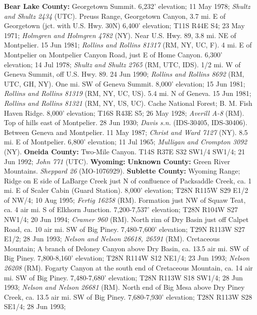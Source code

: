   \textbf{Bear Lake County:}
Georgetown Summit. 6,232' elevation; 11 May 1978;
\textit{Shultz and Shultz 2434} (UTC).
Preuss Range, Georgetown Canyon, 3.7 mi. E of Georgetown
(jct. with U.S. Hwy. 30N) 6,400' elevation; T11S R44E S4; 23 May 1971;
\textit{Holmgren and Holmgren 4782} (NY).
Near U.S. Hwy. 89, 3.8 mi. NE of Montpelier. 15 Jun 1981;
\textit{Rollins and Rollins 81317} (RM, NY, UC, F).
4 mi. E of Montpelier on Montpelier Canyon Road, just E of Home Canyon.
6,300' elevation; 14 Jul 1978; \textit{Shultz and Shultz 2765} (RM, UTC, IDS).
1/2 mi. W of Geneva Summit, off U.S. Hwy. 89. 24 Jun 1990;
\textit{Rollins and Rollins 8692} (RM, UTC, GH, NY).
One mi. SW of Geneva Summit. 8,000' elevation; 15 Jun 1981;
\textit{Rollins and Rollins 81319} (RM, NY, UC, US).
5.4 mi. N of Geneva. 15 Jun 1981;
\textit{Rollins and Rollins 81321} (RM, NY, US, UC).
Cache National Forest; B. M. Fish Haven Ridge. 8,000' elevation; T16S R43E S5;
26 May 1928; \textit{Averill A-8} (RM).
Top of hills east of Montpelier. 28 Jun 1930;
\textit{Davis s.n.} (IDS-30405, IDS-30406).
Between Geneva and Montpelier. 11 May 1987; \textit{Christ and Ward 7127} (NY).
8.5 mi. E of Montpelier. 6,800' elevation; 11 Jul 1965;
\textit{Mulligan and Crompton 3092} (NY).
  \textbf{Oneida County:}
Two-Mile Canyon. T14S R37E S32 SW1/4 SW1/4; 21 Jun 1992;
\textit{John 771} (UTC).
  \textbf{Wyoming:}
  \textbf{Unknown County:}
Green River Mountains. \textit{Sheppard 26} (MO-1076929).
  \textbf{Sublette County:}
Wyoming Range; Ridge on E side of LaBarge Creek just N of confluence of
Packsaddle Creek, ca. 1 mi. E of Scaler Cabin (Guard Station).
8,000’ elevation; T28N R115W S29 E1/2 of NW/4; 10 Aug 1995;
\textit{Fertig 16258} (RM).
Formation just NW of Squaw Teat, ca. 4 air mi. S of Elkhorn Junction.
7,200-7,537' elevation; T28N R104W S27 NW1/4; 20 Jun 1994;
\textit{Cramer 960} (RM).
North rim of Dry Basin just off Calpet Road, ca. 10 air mi. SW of Big Piney.
7,480-7,600’ elevation; T29N R113W S27 E1/2; 28 Jun 1993;
\textit{Nelson and Nelson 26618, 26591} (RM).
Cretaceous Mountain; A branch of Deloney Canyon above Dry Basin, ca. 13.5 air
mi. SW of Big Piney. 7,800-8,160’ elevation; T28N R114W S12 NE1/4; 23 Jun 1993;
\textit{Nelson 26208} (RM).
Fogarty Canyon at the south end of Cretaceous Mountain, ca. 14 air mi. SW of
Big Piney. 7,480-7,680’ elevation; T28N R113W S18 SW1/4; 28 Jun 1993;
\textit{Nelson and Nelson 26681} (RM).
North end of Big Mesa above Dry Piney Creek, ca. 13.5 air mi. SW of Big Piney.
7,680-7,930' elevation; T28N R113W S28	SE1/4; 28 Jun 1993;

